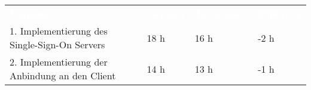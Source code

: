 \begin{tabular}{llll}
\rowcolor{heading}\textcolor{white}{\textbf{Vorgang}} & \textcolor{white}{\textbf{Geplant}} & \textcolor{white}{\textbf{Tatsächlich}} & \textcolor{white}{\textbf{Differenz}} \\
1. Implementierung des Single-Sign-On Servers & 18 h   & 16 h   & -2 h   \\
\rowcolor{odd}2. Implementierung der Anbindung an den Client & 14 h   & 13 h   & -1 h  \\
\end{tabular}

